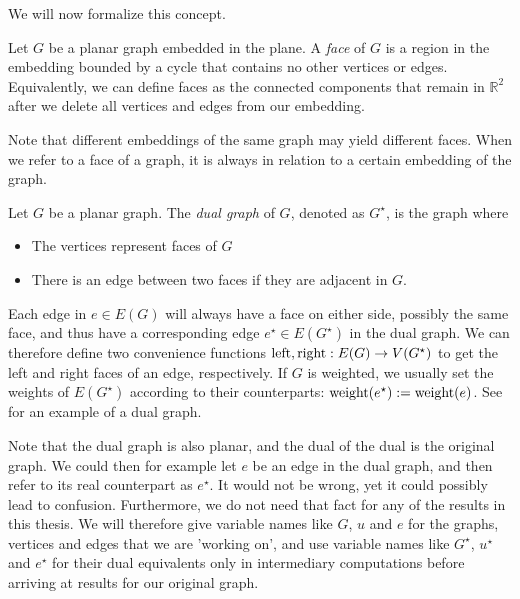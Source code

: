 We will now formalize this concept.

\begin{definition}[Face]
    Let $G$ be a planar graph embedded in the plane. A \emph{face} of $G$ is a region in the embedding bounded by a cycle that contains no other vertices or edges. Equivalently, we can define faces as the connected components that remain in $\mathbb{R}^2$ after we delete all vertices and edges from our embedding. 

    Note that different embeddings of the same graph may yield different faces. When we refer to a face of a graph, it is always in relation to a certain embedding of the graph.
\end{definition}

\begin{definition}
    Let $G$ be a planar graph. The \emph{dual graph} of $G$, denoted as $G^\star$, is the graph where 
    \begin{itemize}
        \item The vertices represent faces of $G$
        \item There is an edge between two faces if they are adjacent in $G$.
    \end{itemize}
\end{definition}

Each edge in $e \in E(G)$ will always have a face on either side, possibly the same face, and thus have a corresponding edge $e^\star \in E(G^\star)$ in the dual graph. We can therefore define two convenience functions $\operatorname{left}, \operatorname{right} : E(G) \rightarrow V(G^\star)$ to get the left and right faces of an edge, respectively. If $G$ is weighted, we usually set the weights of $E(G^\star)$ according to their counterparts: $\operatorname{weight}(e^\star) := \operatorname{weight}(e)$. See  for an example of a dual graph.

Note that the dual graph is also planar, and the dual of the dual is the original graph. We could then for example let $e$ be an edge in the dual graph, and then refer to its real counterpart as $e^\star$. It would not be wrong, yet it could possibly lead to confusion. Furthermore, we do not need that fact for any of the results in this thesis. We will therefore give variable names like $G$, $u$ and $e$ for the graphs, vertices and edges that we are 'working on', and use variable names like $G^\star$, $u^\star$ and $e^\star$ for their dual equivalents only in intermediary computations before arriving at results for our original graph.

